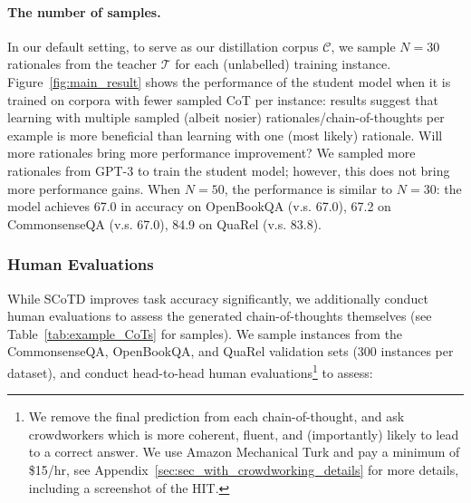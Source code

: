 \documentclass[11pt]{article}
\newcommand{\our}{SCoTD\xspace}
\begin{document}
\paragraph{The number of samples.} 
In our default setting, to serve as our distillation corpus $\mathcal{C}$, we sample $N=30$ rationales from the teacher $\mathcal{T}$ for each (unlabelled) training instance.
Figure~\ref{fig:main_result} shows the performance of the student model when it is trained on corpora with fewer sampled CoT per instance:  %
results suggest that learning with multiple sampled (albeit nosier) rationales/chain-of-thoughts per example is more beneficial than learning with one (most likely) rationale. Will more rationales bring more performance improvement? We sampled more rationales from GPT-3 to train the student model; however, this does not bring more performance gains. When $N=50$, the performance is similar to $N=30$: the model achieves 67.0 in accuracy on OpenBookQA (v.s. 67.0), 67.2 on CommonsenseQA (v.s. 67.0), 84.9 on QuaRel (v.s. 83.8). %

\subsubsection{Human Evaluations}

\label{sec:sec_with_human_experiments}

While SCoTD improves task accuracy significantly, we additionally conduct human evaluations to assess the generated chain-of-thoughts themselves (see Table~\ref{tab:example_CoTs} for samples). We sample instances from the CommonsenseQA, OpenBookQA, and QuaRel validation sets (300 instances per dataset), and conduct head-to-head human evaluations\footnote{We remove the final prediction from each chain-of-thought, and ask crowdworkers which is more coherent, fluent, and (importantly) likely to lead to a correct answer. We use Amazon Mechanical Turk and pay a minimum of \$15/hr, see Appendix~\ref{sec:sec_with_crowdworking_details} for more details, including a screenshot of the HIT.}
to assess:
\end{document}
